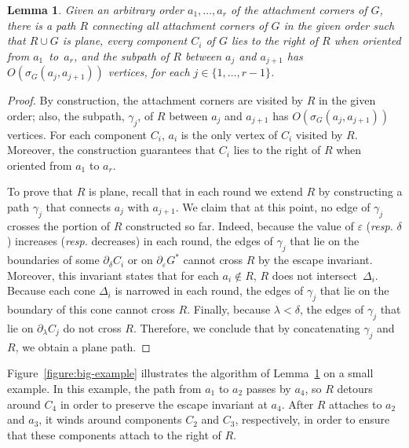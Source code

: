 \documentclass[11pt]{patmorin}
\newtheorem{lemma}[theorem]{Lemma}
\begin{document}
\begin{lemma}\label{lemma:Path for connected augmentations}
Given an arbitrary order $a_1, \ldots, a_r$ of the attachment corners of $G$, there is a path $R$ connecting all attachment corners of $G$ in the given order such that $R\cup G$ is plane, every component $C_i$ of $G$ lies to the right of $R$ when oriented from $a_1$~to~$a_r$, and the subpath of $R$ between $a_j$ and $a_{j+1}$ has $O(\sigma_G(a_j, a_{j+1}))$ vertices, for each $j\in \{1,\dots,r-1\}$.
\end{lemma}
\begin{proof}
By construction, the attachment corners are visited by $R$ in the given order; also, the subpath, $\gamma_j$, of $R$ between $a_{j}$ and $a_{j+1}$ has $O(\sigma_G(a_j,a_{j+1}))$ vertices. For each component $C_i$, $a_i$ is the only vertex of $C_i$ visited by $R$. Moreover, the construction guarantees that $C_i$ lies to the right of $R$ when oriented from $a_1$ to $a_r$.

To prove that $R$ is plane, recall that in each round we extend $R$ by constructing  a path $\gamma_j$ that connects $a_j$ with $a_{j+1}$. We claim that at this point, no edge of $\gamma_j$ crosses the portion of $R$ constructed so far.
Indeed, because the value of $\varepsilon$ (\emph{resp.} $\delta$) increases (\emph{resp.} decreases) in each round, the edges of $\gamma_j$ that lie on the boundaries of some $\partial_\delta C_i$ or on $\partial_\varepsilon G^*$ cannot cross $R$ by the escape invariant.
Moreover, this invariant states that for each $a_i\notin R$, $R$ does not intersect~$\Delta_i$.
Because each cone $\Delta_i$ is narrowed in each round, the edges of $\gamma_j$ that lie on the boundary of this cone cannot cross $R$. Finally, because $\lambda < \delta$, the edges of $\gamma_j$ that lie on $\partial_\lambda C_j$ do not cross $R$. Therefore, we conclude that by concatenating $\gamma_j$ and $R$, we obtain a plane path.
\end{proof}

Figure~\ref{figure:big-example} illustrates the algorithm of Lemma~\ref{lemma:Path for connected augmentations} on a small example.  In this example, the path from $a_1$ to $a_2$ passes by $a_4$, so $R$ detours around $C_4$ in order to preserve the escape invariant at $a_4$.  After $R$ attaches to $a_2$ and $a_3$, it winds around components $C_2$ and $C_3$, respectively, in order to ensure that these components attach to the right of $R$.
\end{document}
